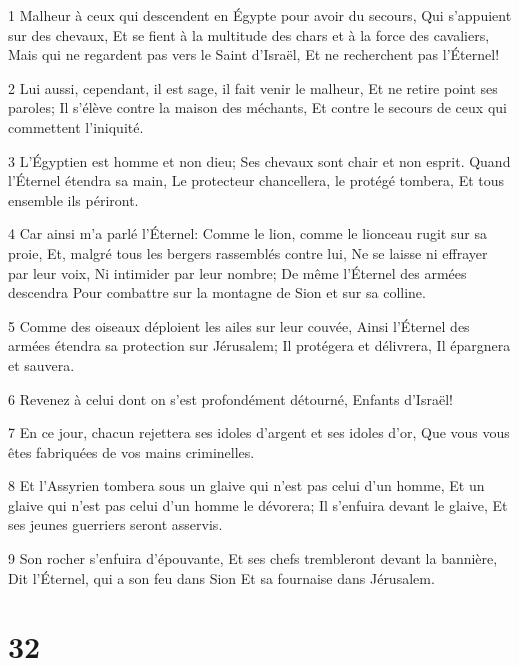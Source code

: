 \par 1 Malheur à ceux qui descendent en Égypte pour avoir du secours, Qui s'appuient sur des chevaux, Et se fient à la multitude des chars et à la force des cavaliers, Mais qui ne regardent pas vers le Saint d'Israël, Et ne recherchent pas l'Éternel!
\par 2 Lui aussi, cependant, il est sage, il fait venir le malheur, Et ne retire point ses paroles; Il s'élève contre la maison des méchants, Et contre le secours de ceux qui commettent l'iniquité.
\par 3 L'Égyptien est homme et non dieu; Ses chevaux sont chair et non esprit. Quand l'Éternel étendra sa main, Le protecteur chancellera, le protégé tombera, Et tous ensemble ils périront.
\par 4 Car ainsi m'a parlé l'Éternel: Comme le lion, comme le lionceau rugit sur sa proie, Et, malgré tous les bergers rassemblés contre lui, Ne se laisse ni effrayer par leur voix, Ni intimider par leur nombre; De même l'Éternel des armées descendra Pour combattre sur la montagne de Sion et sur sa colline.
\par 5 Comme des oiseaux déploient les ailes sur leur couvée, Ainsi l'Éternel des armées étendra sa protection sur Jérusalem; Il protégera et délivrera, Il épargnera et sauvera.
\par 6 Revenez à celui dont on s'est profondément détourné, Enfants d'Israël!
\par 7 En ce jour, chacun rejettera ses idoles d'argent et ses idoles d'or, Que vous vous êtes fabriquées de vos mains criminelles.
\par 8 Et l'Assyrien tombera sous un glaive qui n'est pas celui d'un homme, Et un glaive qui n'est pas celui d'un homme le dévorera; Il s'enfuira devant le glaive, Et ses jeunes guerriers seront asservis.
\par 9 Son rocher s'enfuira d'épouvante, Et ses chefs trembleront devant la bannière, Dit l'Éternel, qui a son feu dans Sion Et sa fournaise dans Jérusalem.

\chapter{32}


